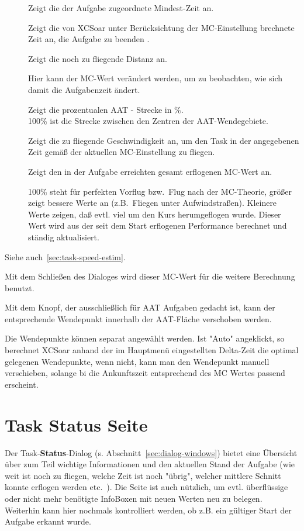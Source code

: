 \begin{description}
\item[]  Zeigt die der Aufgabe zugeordnete Mindest-Zeit an.
\item[]  Zeigt die von \textsf{XCSoar} unter Berücksichtung der MC-Einstellung brechnete Zeit an, die Aufgabe zu beenden .
\item[]  Zeigt die noch zu fliegende Distanz an.
\item[]  Hier kann der MC-Wert verändert werden, um zu beobachten, wie sich damit die Aufgabenzeit ändert. 
\item[] Zeigt die prozentualen AAT - Strecke in \%. \\  100\% ist die Strecke zwischen den Zentren der AAT-Wendegebiete.
\item[]  Zeigt die zu fliegende Geschwindigkeit an, um den Task in der angegebenen Zeit gemäß der aktuellen MC-Einstellung zu fliegen.
\item[]  Zeigt den in der Aufgabe erreichten gesamt erflogenen MC-Wert an.
\item[]  100\% steht für perfekten Vorflug bzw.\ Flug nach der MC-Theorie,  größer zeigt bessere Werte an (z.B.\ Fliegen unter Aufwindstraßen). Kleinere Werte zeigen, daß evtl. viel um den Kurs herumgeflogen wurde.
    Dieser Wert wird aus der seit dem Start erflogenen Performance berechnet und ständig aktualisiert.
\end{description}
Siehe auch~\ref{sec:task-speed-estim}.

Mit dem Schließen des Dialoges wird dieser MC-Wert für die weitere Berechnung benutzt.

Mit dem  Knopf, der ausschließlich für AAT Aufgaben gedacht ist, kann der entsprechende Wendepunkt innerhalb der AAT-Fläche verschoben werden.

 Die Wendepunkte können separat angewählt werden. Ist  "Auto" angeklickt, so berechnet \textsf{XCSoar} anhand der im  Hauptmenü eingestellten Delta-Zeit die optimal gelegenen Wendepunkte, wenn nicht, kann man den Wendepunkt manuell verschieben, solange bi die Ankunftszeit entsprechend des MC Wertes passend erscheint.


\section{Task Status Seite}
Der Task-\textbf{Status}-Dialog (s. Abschnitt~\ref{sec:dialog-windows}) bietet eine Übersicht über zum Teil   wichtige Informationen und den aktuellen Stand der Aufgabe (wie weit ist noch zu fliegen, welche Zeit ist noch "übrig", welcher mittlere Schnitt konnte erflogen werden  etc.\ ). Die Seite ist auch nützlich, um evtl. überflüssige oder nicht mehr benötigte InfoBoxen mit neuen Werten neu zu belegen. Weiterhin kann hier nochmals kontrolliert werden, ob z.B. ein gültiger Start der Aufgabe erkannt wurde.


